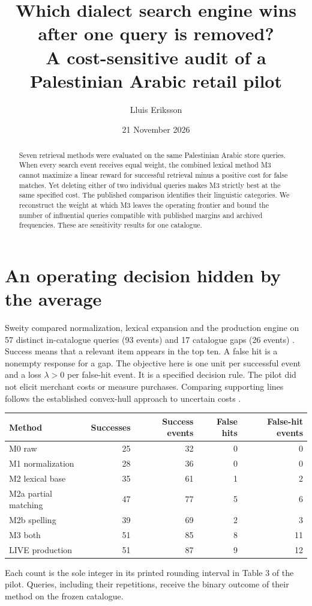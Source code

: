 \documentclass[11pt]{article}
\title{Which dialect search engine wins after one query is removed?\\A cost-sensitive audit of a Palestinian Arabic retail pilot}
\author{Lluis Eriksson}\date{21 November 2026}
\begin{document}
\maketitle
\begin{abstract}
Seven retrieval methods were evaluated on the same Palestinian Arabic store queries. When every search event receives equal weight, the combined lexical method M3 cannot maximize a linear reward for successful retrieval minus a positive cost for false matches. Yet deleting either of two individual queries makes M3 strictly best at the same specified cost. The published comparison identifies their linguistic categories. We reconstruct the weight at which M3 leaves the operating frontier and bound the number of influential queries compatible with published margins and archived frequencies. These are sensitivity results for one catalogue.
\end{abstract}
\section{An operating decision hidden by the average}
Sweity compared normalization, lexical expansion and the production engine on 57 distinct in-catalogue queries (93 events) and 17 catalogue gaps (26 events) \cite{sweity}. Success means that a relevant item appears in the top ten. A false hit is a nonempty response for a gap. The objective here is one unit per successful event and a loss $\lambda>0$ per false-hit event. It is a specified decision rule. The pilot did not elicit merchant costs or measure purchases. Comparing supporting lines follows the established convex-hull approach to uncertain costs \cite{provost}.
\begin{center}\begin{tabular}{lrrrr}\toprule
Method & Successes & Success events & False hits & False-hit events\\\midrule
M0 raw &25&32&0&0\\ M1 normalization &28&36&0&0\\ M2 lexical base &35&61&1&2\\
M2a partial matching &47&77&5&6\\ M2b spelling &39&69&2&3\\ M3 both &51&85&8&11\\
LIVE production &51&87&9&12\\\bottomrule\end{tabular}\end{center}
Each count is the sole integer in its printed rounding interval in Table 3 of the pilot. Queries, including their repetitions, receive the binary outcome of their method on the frozen catalogue.
\newpage
\end{document}
